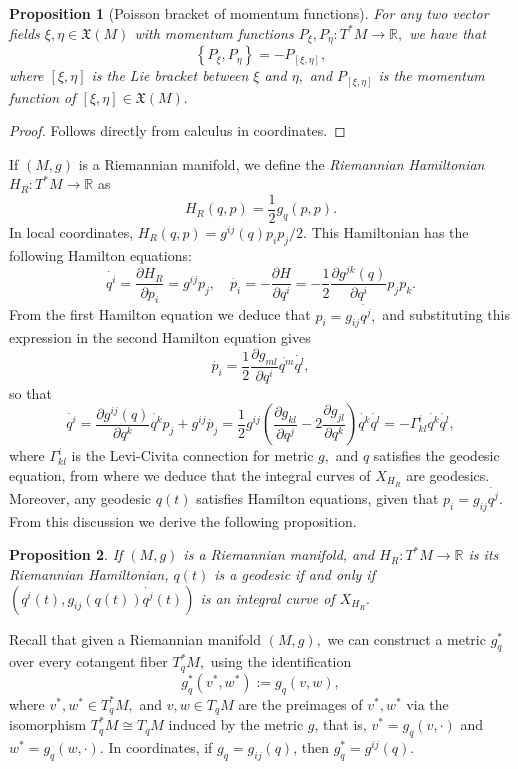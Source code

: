 \documentclass[12pt, letterpaper, reqno]{amsart}
\theoremstyle{definition}
\theoremstyle{plain}
\newtheorem{prop}{Proposition}
\theoremstyle{remark}
\begin{document}
\begin{prop}[Poisson bracket of momentum functions]
	For any two vector fields $ \xi,\eta \in \mathfrak{X}(M) $ with momentum functions $ P_\xi, P_\eta: T^*M \rightarrow \mathbb{R}, $ we have that
	$$ \left\{ P_\xi,P_\eta \right\} = -P_{[\xi,\eta]}, $$ 
	where $ [\xi,\eta] $ is the Lie bracket between $ \xi $ and $ \eta, $ and $ P_{[\xi,\eta]} $ is the momentum function of $ [\xi,\eta]\in \mathfrak{X}(M). $  
\end{prop}
\begin{proof}
	Follows directly from calculus in coordinates.
\end{proof}
If $ (M,g) $ is a Riemannian manifold, we define the \textit{Riemannian Hamiltonian} $ H_R: T^*M \rightarrow \mathbb{R} $ as
$$ H_R(q,p)=\frac{1}{2} g_q(p,p).$$
In local coordinates, $  H_R(q,p)= g^{ij}(q)p_ip_j/2. $ This Hamiltonian has the following Hamilton equations:
$$ \dot{q^i} = \frac{\partial H_R}{\partial p_i} = g^{ij}p_j, \quad \dot{p_i} = - \frac{\partial H}{\partial q^i} = - \frac{1}{2} \frac{\partial g^{jk}(q)}{\partial q^i} p_jp_k. $$ 
From the first Hamilton equation we deduce that $ p_i = g_{ij}\dot{q^j}, $ and substituting this expression in the second Hamilton equation gives $$ \dot{p_i} = \frac{1}{2} \frac{\partial g_{ml}}{\partial q^i}\dot{q^m}\dot{q^l} ,$$ so that 
$$ \ddot{q^i} = \frac{\partial g^{ij}(q)}{\partial q^k} \dot{q^k}p_j+ g^{ij}\dot{p_j}= \frac{1}{2} g^{ij} \left( \frac{\partial g_{kl}}{\partial q^j}-2 \frac{\partial g_{jl}}{\partial q^k}   \right)\dot{q^k}\dot{q^l} = -\Gamma_{kl}^i \dot{q^k}\dot{q^l},$$ 
where $ \Gamma_{kl}^i $ is the Levi-Civita connection for metric $ g, $  and $ q $ satisfies the geodesic equation, from where we deduce that the integral curves of $ X_{H_R} $ are geodesics. Moreover, any geodesic $ q(t) $ satisfies Hamilton equations, given that $ p_i = g_{ij}\dot{q^j}. $ From this discussion we derive the following proposition.

\begin{prop}\label{prop:geo}
	If $ (M,g) $ is a Riemannian manifold, and $ H_R: T^*M \rightarrow \mathbb{R} $ is its Riemannian Hamiltonian, $ q(t) $ is a geodesic if and only if $ (q^i(t), g_{ij}(q(t))\dot{q^j}(t)) $ is an integral curve of $ X_{H_R}. $ 
\end{prop}

Recall that given a Riemannian manifold $ (M,g), $ we can construct a metric $ g^*_q $  over every cotangent fiber $ T^*_q M, $ using the identification
$$ g^*_q(v^*,w^*):=g_q(v,w), $$ 
where $ v^*,w^*\in T^*_qM, $ and $ v,w\in T_qM $ are the preimages of $ v^*,w^* $ via the isomorphism $ T^*_qM\cong T_qM $ induced by the metric $ g $, that is, $ v^*=g_q(v,\cdot) $ and $ w^*=g_q(w,\cdot) $. In coordinates, if $ g_q=g_{ij}(q) $, then $ g^*_q=g^{ij}(q). $
\end{document}
